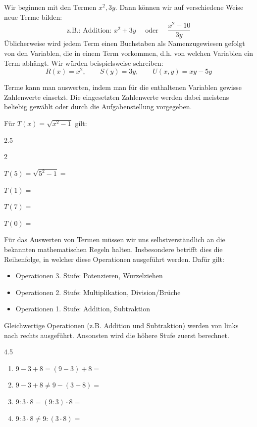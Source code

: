 \documentclass[11pt,oneside]{article}
\begin{document}
    \begin{beispiel}
    	Wir beginnen mit den Termen $x^{2}, 3y$. Dann können wir auf verschiedene Weise neue Terme bilden:
    	\[\text{z.B.: Addition: } x^{2} + 3y \quad\text{ oder }\quad\frac{x^{2} - 10}{3y}\]
        Üblicherweise wird jedem Term einen Buchstaben als \flqq Namen\frqq\:zugewiesen gefolgt von den Variablen, die in einem Term vorkommen, d.h. \glqq von welchen Variablen ein Term abhängt\grqq. Wir würden beispielsweise schreiben:
        \[R(x) = x^{2}, \qquad S(y)=3y, \qquad U(x,y)=xy - 5y\]
    \end{beispiel}
    Terme kann man auswerten, indem man für die enthaltenen Variablen gewisse Zahlenwerte einsetzt. Die eingesetzten Zahlenwerte werden dabei meistens beliebig gewählt oder durch die Aufgabenstellung vorgegeben.\\
    \begin{beispiel}
    	Für $T(x)=\sqrt{x^{2}-1}$ gilt:
    	\begin{gridspace}{2.5}
    		\begin{enumerate}[label=\ ,leftmargin=1.1cm]\vspace*{-1mm}\end{enumerate}
    	\end{gridspace}
    \end{beispiel}
    Für das Auswerten von Termen müssen wir uns selbstverständlich an die bekannten mathematischen Regeln halten. Insbesondere betrifft dies die Reihenfolge, in welcher diese Operationen ausgeführt werden. Dafür gilt:
    \begin{itemize}
        \item Operationen 3. Stufe: Potenzieren, Wurzelziehen
        \item Operationen 2. Stufe: Multiplikation, Division/Brüche
        \item Operationen 1. Stufe: Addition, Subtraktion
    \end{itemize}
    Gleichwertige Operationen (z.B. Addition und Subtraktion) werden von links nach rechts ausgeführt. Ansonsten wird die höhere Stufe zuerst berechnet.
    \begin{gridspace}{4.5}
    	\begin{enumerate}[label=\ ,leftmargin=1.1cm]
    		\item $9 - 3 + 8 = (9-3)+8=$
    		\item $9 - 3 + 8  \neq 9 - (3+8)=$
    		\item $9 : 3 \cdot 8 = (9:3) \cdot 8=$
    		\item $9 : 3 \cdot 8 \neq 9 : (3 \cdot 8)=$
    	\end{enumerate}
    \end{gridspace}
\end{document}
